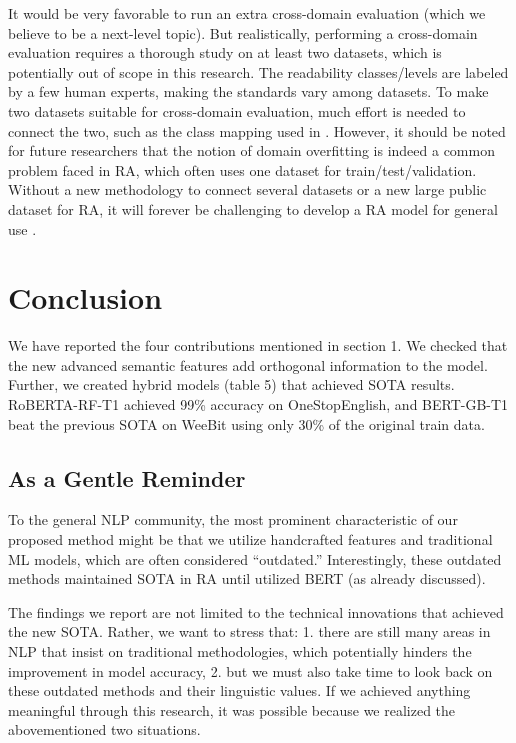 \documentclass[11pt]{article}
\begin{document}
It would be very favorable to run an extra cross-domain evaluation (which we believe to be a next-level topic). But realistically, performing a cross-domain evaluation requires a thorough study on at least two datasets, which is potentially out of scope in this research. The readability classes/levels are labeled by a few human experts, making the standards vary among datasets. To make two datasets suitable for cross-domain evaluation, much effort is needed to connect the two, such as the class mapping used in \citet{Xia:16}. However, it should be noted for future researchers that the notion of domain overfitting is indeed a common problem faced in RA, which often uses one dataset for train/test/validation. Without a new methodology to connect several datasets or a new large public dataset for RA, it will forever be challenging to develop a RA model for general use \citep{vajjala2021trends}. 

\section{Conclusion}
We have reported the four contributions mentioned in section 1. We checked that the new advanced semantic features add orthogonal information to the model. Further, we created hybrid models (table 5) that achieved SOTA results. RoBERTA-RF-T1 achieved 99\% accuracy on OneStopEnglish, and BERT-GB-T1 beat the previous SOTA on WeeBit using only 30\% of the original train data.

\subsection{As a Gentle Reminder}
To the general NLP community, the most prominent characteristic of our proposed method might be that we utilize handcrafted features and traditional ML models, which are often considered ``outdated.'' Interestingly, these outdated methods maintained SOTA in RA until \citet{Martinc:21} utilized BERT (as already discussed). 

The findings we report are not limited to the technical innovations that achieved the new SOTA. Rather, we want to stress that: 1. there are still many areas in NLP that insist on traditional methodologies, which potentially hinders the improvement in model accuracy, 2. but we must also take time to look back on these outdated methods and their linguistic values. If we achieved anything meaningful through this research, it was possible because we realized the abovementioned two situations.
\end{document}
